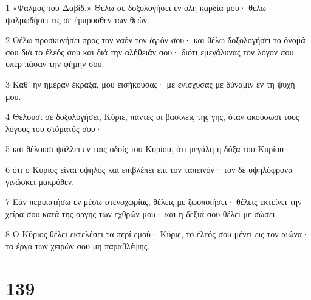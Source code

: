 \par 1 «Ψαλμός του Δαβίδ.» Θέλω σε δοξολογήσει εν όλη καρδία μου· θέλω ψαλμωδήσει εις σε έμπροσθεν των θεών.
\par 2 Θέλω προσκυνήσει προς τον ναόν τον άγιόν σου· και θέλω δοξολογήσει το όνομά σου διά το έλεός σου και διά την αλήθειάν σου· διότι εμεγάλυνας τον λόγον σου υπέρ πάσαν την φήμην σου.
\par 3 Καθ' ην ημέραν έκραξα, μου εισήκουσας· με ενίσχυσας με δύναμιν εν τη ψυχή μου.
\par 4 Θέλουσι σε δοξολογήσει, Κύριε, πάντες οι βασιλείς της γης, όταν ακούσωσι τους λόγους του στόματός σου·
\par 5 και θέλουσι ψάλλει εν ταις οδοίς του Κυρίου, ότι μεγάλη η δόξα του Κυρίου·
\par 6 ότι ο Κύριος είναι υψηλός και επιβλέπει επί τον ταπεινόν· τον δε υψηλόφρονα γινώσκει μακρόθεν.
\par 7 Εάν περιπατήσω εν μέσω στενοχωρίας, θέλεις με ζωοποιήσει· θέλεις εκτείνει την χείρα σου κατά της οργής των εχθρών μου· και η δεξιά σου θέλει με σώσει.
\par 8 Ο Κύριος θέλει εκτελέσει τα περί εμού· Κύριε, το έλεός σου μένει εις τον αιώνα· τα έργα των χειρών σου μη παραβλέψης.

\chapter{139}

